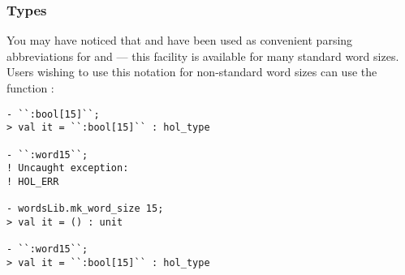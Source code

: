 \subsubsection{Types}

You may have noticed that  and  have been used as convenient parsing abbreviations for \ty{:\bool[4]} and \ty{:\bool[8]} --- this facility is available for many standard word sizes.  Users wishing to use this notation for non-standard word sizes can use the function :
\begin{session}
\begin{verbatim}
- ``:bool[15]``;
> val it = ``:bool[15]`` : hol_type

- ``:word15``;
! Uncaught exception:
! HOL_ERR

- wordsLib.mk_word_size 15;
> val it = () : unit

- ``:word15``;
> val it = ``:bool[15]`` : hol_type
\end{verbatim}
\end{session}

